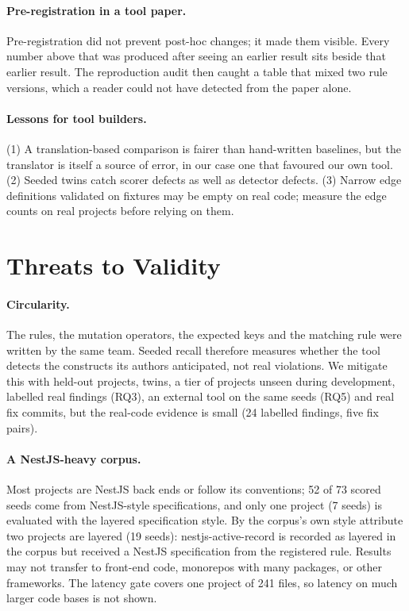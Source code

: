 \documentclass[10pt,a4paper]{article}
\begin{document}
\paragraph{Pre-registration in a tool paper.}
Pre-registration did not prevent post-hoc changes; it made them visible. Every number above that was produced after
seeing an earlier result sits beside that earlier result. The reproduction audit then caught a table that mixed two
rule versions, which a reader could not have detected from the paper alone.

\paragraph{Lessons for tool builders.}
(1) A translation-based comparison is fairer than hand-written baselines, but the translator is itself a source of
error, in our case one that favoured our own tool. (2) Seeded twins catch scorer defects as well as detector
defects. (3) Narrow edge definitions validated on fixtures may be empty on real code; measure the edge counts on real
projects before relying on them.

\section{Threats to Validity}\label{sec:threats}

\paragraph{Circularity.}
The rules, the mutation operators, the expected keys and the matching rule were written by the same team. Seeded
recall therefore measures whether the tool detects the constructs its authors anticipated, not real violations. We
mitigate this with held-out projects, twins, a tier of projects unseen during development, labelled real findings
(RQ3), an external tool on the same seeds (RQ5) and real fix commits, but the real-code evidence is small (24 labelled
findings, five fix pairs).

\paragraph{A NestJS-heavy corpus.}
Most projects are NestJS back ends or follow its conventions; 52 of 73 scored seeds come from NestJS-style
specifications, and only one project (7 seeds) is evaluated with the layered specification style. By the corpus's
own style attribute two projects are layered (19 seeds): nestjs-active-record is recorded as layered in the corpus
but received a NestJS specification from the registered rule. %
Results may not transfer to front-end code, monorepos with many packages, or other frameworks. The latency gate
covers one project of 241 files, so latency on much larger code bases is not shown.
\end{document}
